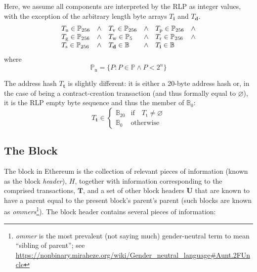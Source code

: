 \documentclass[9pt,oneside]{amsart}
\begin{document}
\begin{multicols}{2}
Here, we assume all components are interpreted by the RLP as integer values, with the exception of the arbitrary length byte arrays $T_{\mathbf{i}}$ and $T_{\mathbf{d}}$.
\begin{equation}
\begin{array}[t]{lclclc}
T_{\mathrm{n}} \in \mathbb{P}_{256} & \wedge & T_{\mathrm{v}} \in \mathbb{P}_{256} & \wedge & T_{\mathrm{p}} \in \mathbb{P}_{256} & \wedge \\
T_{\mathrm{g}} \in \mathbb{P}_{256} & \wedge & T_{\mathrm{w}} \in \mathbb{P}_5 & \wedge & T_{\mathrm{r}} \in \mathbb{P}_{256} & \wedge \\
T_{\mathrm{s}} \in \mathbb{P}_{256} & \wedge & T_{\mathbf{d}} \in \mathbb{B} & \wedge & T_{\mathbf{i}} \in \mathbb{B}
\end{array}
\end{equation}
where
\begin{equation}
\mathbb{P}_{\mathrm{n}} = \{ P: P \in \mathbb{P} \wedge P < 2^n \}
\end{equation}

The address hash $T_{\mathbf{t}}$ is slightly different: it is either a 20-byte address hash or, in the case of being a contract-creation transaction (and thus formally equal to $\varnothing$), it is the RLP empty byte sequence and thus the member of $\mathbb{B}_0$:
\begin{equation}
T_{\mathbf{t}} \in \begin{cases} \mathbb{B}_{20} & \text{if} \quad T_{\mathrm{t}} \neq \varnothing \\
\mathbb{B}_{0} & \text{otherwise}\end{cases}
\end{equation}

\subsection{The Block} \label{ch:block}

The block in Ethereum is the collection of relevant pieces of information (known as the block \textit{header}), $H$, together with information corresponding to the comprised transactions, $\mathbf{T}$,\hypertarget{ommerheaders}{} and a set of other block headers $\mathbf{U}$ that are known to have a parent equal to the present block's parent's parent (such blocks are known as \textit{ommers}\footnote{\textit{ommer} is the most prevalent (not saying much) gender-neutral term to mean ``sibling of parent''; see \url{https://nonbinary.miraheze.org/wiki/Gender_neutral_language\#Aunt.2FUncle}}). The block header contains several pieces of information:


\end{multicols}
\end{document}
